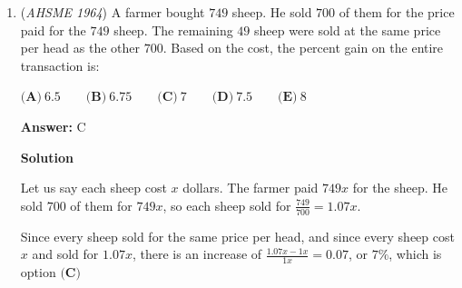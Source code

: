 \begin{enumerate}
 $\textbf{(A)}\ 1:3 \qquad \textbf{(B)}\ 2:5 \qquad \textbf{(C)}\ 1:2 \qquad \textbf{(D)}\ 2:3 \qquad \textbf{(E)}\ 3:4$

 \textbf{Answer: }A



\textbf{Solution 1}

Label our triangle $ABC$ where that $AB=17$, $AC=13$, and $BC=8$. Let $L$, $J$, and $K$ be the tangency points of $BC$, $AC$, and $AB$ respectively. Let $AK=x$, which implies $AJ=x$. Thus $KB=BL=17-x$ and $JC=LC=13-x$. 

 Since $BL+LC=(17-x)+(13-x)=8$, $x=11$. Thus $r:s=CL:BL=13-x:17-x=2:6=1:3$, hence our answer is $\fbox{A}$.

 



\textbf{Solution 2}

Let the three sides of $8, 13, 17$ be split into two lengths each, for a total of six segments.  Because the vertices of the triangle form two congruent external tangents to the triangle each, there are really only three unique lengths, and two of these three lengths each make up a side.  Thus, we can make a system of three equations in there variables:  $a+b = 8, b+c=13, c+a=17$.  

 Adding all three equations and dividing by $2$ gives $a+b+c = 19$.  Subtracting each equation from that gives $(a, b, c) = (6,2,11)$

 Thus, $a+b$ makes up the shortest side of $8$.  The ratio is $2:6$, or $1:3$, which is answer $\fbox{A}$.

 


	\item (\textit{AHSME 1964}) A farmer bought $749$ sheep. He sold $700$ of them for the price paid for the $749$ sheep. 
The remaining $49$ sheep were sold at the same price per head as the other $700$. 
Based on the cost, the percent gain on the entire transaction is:


 $\textbf{(A)}\ 6.5 \qquad \textbf{(B)}\ 6.75 \qquad \textbf{(C)}\ 7 \qquad \textbf{(D)}\ 7.5 \qquad \textbf{(E)}\ 8$

 \textbf{Answer: }C



\textbf{Solution}

Let us say each sheep cost $x$ dollars.  The farmer paid $749x$ for the sheep.  He sold $700$ of them for $749x$, so each sheep sold for $\frac{749}{700} = 1.07x$.

 Since every sheep sold for the same price per head, and since every sheep cost $x$ and sold for $1.07x$, there is an increase of $\frac{1.07x - 1x}{1x} = 0.07$, or $7\%$, which is option $\boxed{\textbf{(C)}}$




\end{enumerate}

